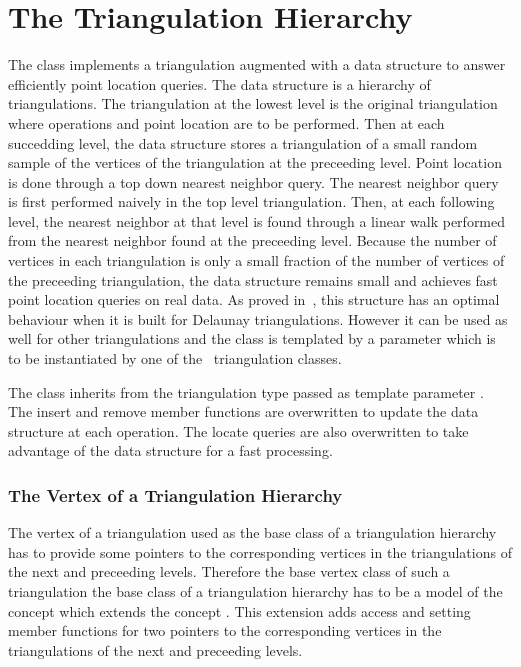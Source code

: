\section{The Triangulation Hierarchy}
\label{Section_2D_Triangulations_Hierarchy}


The class 
implements a triangulation augmented with
a data structure to answer efficiently  point location queries.
The data structure is a hierarchy 
of triangulations. The triangulation at the lowest level is
the original triangulation where operations and point location are to 
be performed.
Then at each succedding level, the data structure
stores a triangulation of a small random sample of the vertices
of the triangulation at the preceeding level. Point location
is done through a top down nearest neighbor query.
The nearest neighbor query is first
performed naively in the top level triangulation.
Then, at each following level, the nearest neighbor at that level
is found through a linear walk performed from
the nearest neighbor found at the preceeding level.
Because the number of vertices in each triangulation is only a small
fraction of the number of vertices of the preceeding triangulation,
the data structure remains small and achieves fast point location 
queries  on real
data. As proved in~\cite{d-iirdt-98}, this structure has an optimal behaviour
when it is built for Delaunay triangulations.
However it can be used as well for other triangulations
and the class  is templated by a parameter
which is to be instantiated by one of the \cgal\ triangulation
classes.


The class  inherits from the
triangulation type passed as template parameter . 
The insert and remove member functions
are  overwritten to update the data structure at each operation.
The locate queries are also overwritten to take advantage of the data
structure for a fast processing.

\subsubsection{The Vertex of a Triangulation Hierarchy}
The vertex of a triangulation  used as
the base class of a triangulation hierarchy 
has to provide
some pointers to the corresponding vertices in the
triangulations of the next and preceeding levels.
Therefore the base vertex class of such a  triangulation
the base class of a triangulation hierarchy 
has to be a model of the
concept
 which extends
the concept .
This extension adds
access and setting member functions 
for two pointers  to the corresponding vertices in the 
triangulations of the next and preceeding levels.

